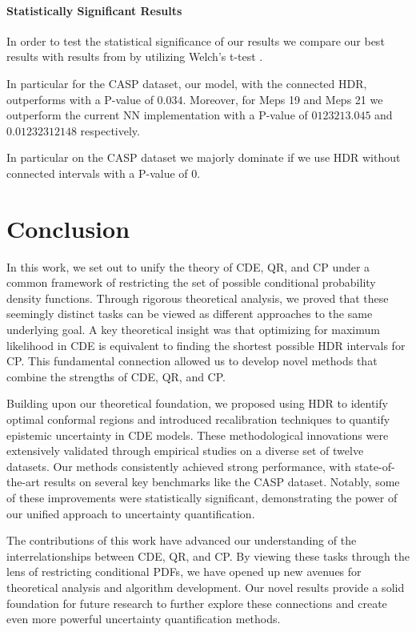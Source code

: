 \subsubsection{Statistically Significant Results}
In order to test the statistical significance of our results we compare our best results with results from \cite{sesia2021conformal} by utilizing Welch's t-test \cite{welch1947generalization}.

In particular for the CASP dataset, our model, with the connected HDR, outperforms \cite{sesia2021conformal} with a P-value of $0.034$. Moreover, for Meps 19 and Meps 21 we outperform the current NN implementation with a P-value of $0123213.045$ and $0.01232312148$ respectively. 

In particular on the CASP dataset we majorly dominate if we use HDR without connected intervals with a P-value of $0$.

\chapter{Conclusion}\label{chap:conclusion}

In this work, we set out to unify the theory of CDE, QR, and CP under a common framework of restricting the set of possible conditional probability density functions. Through rigorous theoretical analysis, we proved that these seemingly distinct tasks can be viewed as different approaches to the same underlying goal. A key theoretical insight was that optimizing for maximum likelihood in CDE is equivalent to finding the shortest possible HDR intervals for CP. This fundamental connection allowed us to develop novel methods that combine the strengths of CDE, QR, and CP.

Building upon our theoretical foundation, we proposed using HDR to identify optimal conformal regions and introduced recalibration techniques to quantify epistemic uncertainty in CDE models. These methodological innovations were extensively validated through empirical studies on a diverse set of twelve datasets. Our methods consistently achieved strong performance, with state-of-the-art results on several key benchmarks like the CASP dataset. Notably, some of these improvements were statistically significant, demonstrating the power of our unified approach to uncertainty quantification.

The contributions of this work have advanced our understanding of the interrelationships between CDE, QR, and CP. By viewing these tasks through the lens of restricting conditional PDFs, we have opened up new avenues for theoretical analysis and algorithm development. Our novel results provide a solid foundation for future research to further explore these connections and create even more powerful uncertainty quantification methods.

